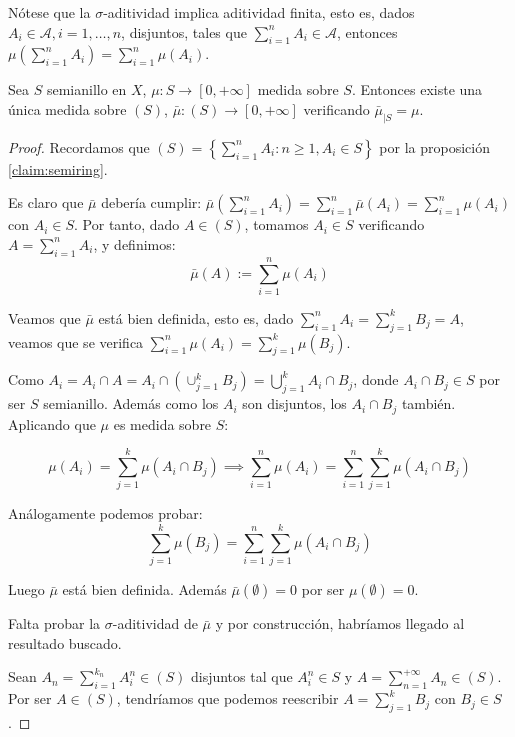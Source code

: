 Nótese que la $\sigma$-aditividad implica aditividad finita, esto es, dados $A_i \in \mathcal{A}, i=1, \ldots, n$,
disjuntos, tales que $\sum_{i=1}^n A_i \in \mathcal{A}$, entonces $\mu\left(\sum_{i=1}^{n} A_i \right)= \sum_{i=1}^{n} \mu(A_i)$.

\begin{theorem}
 Sea $S$ semianillo en $X$, $\mu: S \rightarrow [0,+\infty]$ medida sobre $S$. Entonces existe una única medida 
 sobre $(S)$, $\bar{\mu}: (S) \rightarrow [0,+\infty]$ verificando $\bar{\mu}_{|S} = \mu$.
 
 \label{th:ext-semitoring}
\end{theorem}

\begin{proof}
 Recordamos que $(S) = \left\{\sum_{i=1}^n A_i: n\ge 1, A_i \in S \right\}$ por la proposición \ref{claim:semiring}.
 
 Es claro que $\bar{\mu}$ debería cumplir: 
 $\bar{\mu}\left(\sum_{i=1}^n A_i\right) = \sum_{i=1}^n \bar{\mu}(A_i) = \sum_{i=1}^n \mu(A_i)$
 con $A_i \in S$. Por tanto, dado $A\in (S)$, tomamos $A_i\in S$ verificando $A = \sum_{i=1}^n A_i$, y definimos: 
 \[\bar{\mu}(A) := \sum_{i=1}^n \mu(A_i)\]
 
 Veamos que $\bar{\mu}$ está bien definida, esto es, dado $\sum_{i=1}^n A_i = \sum_{j=1}^k B_j = A$, 
 veamos que se verifica $\sum_{i=1}^n \mu(A_i) = \sum_{j=1}^k \mu(B_j)$.
 
 Como $A_i = A_i \cap A = A_i \cap \left(\cup_{j=1}^k B_j\right) = \bigcup_{j=1}^k A_i \cap B_j$, donde 
 $A_i \cap B_j \in S$ por ser $S$ semianillo. Además como los $A_i$ son disjuntos, los $A_i\cap B_j$ también.
 Aplicando que $\mu$ es medida sobre $S$:
 
 \[\mu(A_i) = \sum_{j=1}^k \mu(A_i \cap B_j) \implies \sum_{i=1}^n \mu(A_i) = 
              \sum_{i=1}^n \sum_{j=1}^k \mu(A_i \cap B_j)\]
 
 Análogamente podemos probar:
 \[\sum_{j=1}^k \mu(B_j) = \sum_{i=1}^n \sum_{j=1}^k \mu(A_i \cap B_j)\]
 
 Luego $\bar{\mu}$ está bien definida. Además $\bar{\mu} (\emptyset) = 0$ por ser $\mu(\emptyset) = 0$.
 
 Falta probar la $\sigma$-aditividad de $\bar{\mu}$ y por construcción, habríamos llegado al resultado buscado.
 
 Sean $A_n = \sum_{i=1}^{k_n} A_i^n \in (S)$ disjuntos tal que $A_i^n \in S$ y $A = \sum_{n=1}^{+\infty} A_n \in (S)$. 
 Por ser $A \in (S)$, tendríamos que podemos reescribir $A = \sum_{j=1}^k B_j$ con $B_j \in S$.
 

\end{proof}
